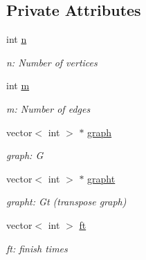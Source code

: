 \subsection*{Private Attributes}
\begin{DoxyCompactItemize}
\item 
\mbox{\label{classKosaraju_a43acb7cefc69ce4e11c93ececce01ecb}} 
int \mbox{\hyperlink{classKosaraju_a43acb7cefc69ce4e11c93ececce01ecb}{n}}
\begin{DoxyCompactList}\small\item\em n\+: Number of vertices \end{DoxyCompactList}\item 
\mbox{\label{classKosaraju_a7fdb8e3b71f5c02717859fdaa6a4be7a}} 
int \mbox{\hyperlink{classKosaraju_a7fdb8e3b71f5c02717859fdaa6a4be7a}{m}}
\begin{DoxyCompactList}\small\item\em m\+: Number of edges \end{DoxyCompactList}\item 
\mbox{\label{classKosaraju_a965600a40739d74824733fa521457710}} 
vector$<$ int $>$ $\ast$ \mbox{\hyperlink{classKosaraju_a965600a40739d74824733fa521457710}{graph}}
\begin{DoxyCompactList}\small\item\em graph\+: G \end{DoxyCompactList}\item 
\mbox{\label{classKosaraju_a26ec179ff24cf2eb7d89500b868739cf}} 
vector$<$ int $>$ $\ast$ \mbox{\hyperlink{classKosaraju_a26ec179ff24cf2eb7d89500b868739cf}{grapht}}
\begin{DoxyCompactList}\small\item\em grapht\+: Gt (transpose graph) \end{DoxyCompactList}\item 
\mbox{\label{classKosaraju_a95456794962fa05f38eeffedd1750f24}} 
vector$<$ int $>$ \mbox{\hyperlink{classKosaraju_a95456794962fa05f38eeffedd1750f24}{ft}}
\begin{DoxyCompactList}\small\item\em ft\+: finish times \end{DoxyCompactList}\item 

\end{DoxyCompactItemize}
